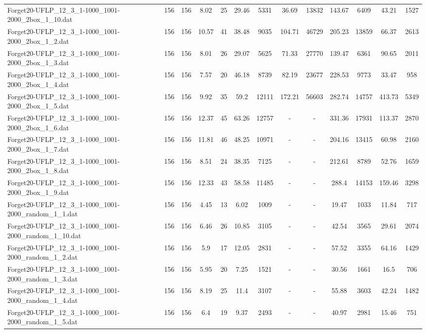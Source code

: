 \begin{table}[!ht]
{\begin{tabular}{lcccccccccccc}
Forget20-UFLP\_12\_3\_1-1000\_1001-2000\_2box\_1\_10.dat & 156 & 156 & 8.02 & 25 & 29.46 & 5331 & 36.69 & 13832 & 143.67 & 6409 & 43.21 & 1527 \\
Forget20-UFLP\_12\_3\_1-1000\_1001-2000\_2box\_1\_2.dat & 156 & 156 & 10.57 & 41 & 38.48 & 9035 & 104.71 & 46729 & 205.23 & 13859 & 66.37 & 2613 \\
Forget20-UFLP\_12\_3\_1-1000\_1001-2000\_2box\_1\_3.dat & 156 & 156 & 8.01 & 26 & 29.07 & 5625 & 71.33 & 27770 & 139.47 & 6361 & 90.65 & 2011 \\
Forget20-UFLP\_12\_3\_1-1000\_1001-2000\_2box\_1\_4.dat & 156 & 156 & 7.57 & 20 & 46.18 & 8739 & 82.19 & 23677 & 228.53 & 9773 & 33.47 & 958 \\
Forget20-UFLP\_12\_3\_1-1000\_1001-2000\_2box\_1\_5.dat & 156 & 156 & 9.92 & 35 & 59.2 & 12111 & 172.21 & 56603 & 282.74 & 14757 & 413.73 & 5349 \\
Forget20-UFLP\_12\_3\_1-1000\_1001-2000\_2box\_1\_6.dat & 156 & 156 & 12.37 & 45 & 63.26 & 12757 &  - &  - & 331.36 & 17931 & 113.37 & 2870 \\
Forget20-UFLP\_12\_3\_1-1000\_1001-2000\_2box\_1\_7.dat & 156 & 156 & 11.81 & 46 & 48.25 & 10971 &  - &  - & 204.16 & 13415 & 60.98 & 2160 \\
Forget20-UFLP\_12\_3\_1-1000\_1001-2000\_2box\_1\_8.dat & 156 & 156 & 8.51 & 24 & 38.35 & 7125 &  - &  - & 212.61 & 8789 & 52.76 & 1659 \\
Forget20-UFLP\_12\_3\_1-1000\_1001-2000\_2box\_1\_9.dat & 156 & 156 & 12.33 & 43 & 58.58 & 11485 &  - &  - & 288.4 & 14153 & 159.46 & 3298 \\
Forget20-UFLP\_12\_3\_1-1000\_1001-2000\_random\_1\_1.dat & 156 & 156 & 4.45 & 13 & 6.02 & 1009 &  - &  - & 19.47 & 1033 & 11.84 & 717 \\
Forget20-UFLP\_12\_3\_1-1000\_1001-2000\_random\_1\_10.dat & 156 & 156 & 6.46 & 26 & 10.85 & 3105 &  - &  - & 42.54 & 3565 & 29.61 & 2074 \\
Forget20-UFLP\_12\_3\_1-1000\_1001-2000\_random\_1\_2.dat & 156 & 156 & 5.9 & 17 & 12.05 & 2831 &  - &  - & 57.52 & 3355 & 64.16 & 1429 \\
Forget20-UFLP\_12\_3\_1-1000\_1001-2000\_random\_1\_3.dat & 156 & 156 & 5.95 & 20 & 7.25 & 1521 &  - &  - & 30.56 & 1661 & 16.5 & 706 \\
Forget20-UFLP\_12\_3\_1-1000\_1001-2000\_random\_1\_4.dat & 156 & 156 & 8.19 & 25 & 11.4 & 3107 &  - &  - & 55.88 & 3603 & 42.24 & 1482 \\
Forget20-UFLP\_12\_3\_1-1000\_1001-2000\_random\_1\_5.dat & 156 & 156 & 6.4 & 19 & 9.37 & 2493 &  - &  - & 40.97 & 2981 & 15.46 & 751 \\

\end{tabular}}
\end{table}
